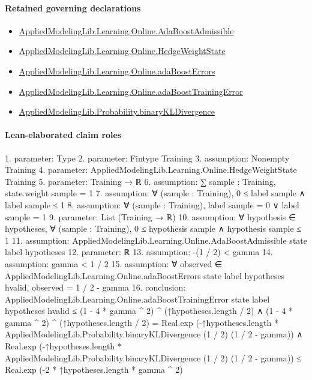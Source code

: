 \documentclass[10pt]{article}
\begin{document}
\paragraph{Retained governing declarations}
\begin{itemize}\raggedright
\item \hyperlink{library-prerequisite-2771987b29f636cf}{Applied\allowbreak{}Modeling\allowbreak{}Lib.\allowbreak{}Learning.\allowbreak{}Online.\allowbreak{}Ada\allowbreak{}Boost\allowbreak{}Admissible}
\item \hyperlink{library-prerequisite-8196082d02788389}{Applied\allowbreak{}Modeling\allowbreak{}Lib.\allowbreak{}Learning.\allowbreak{}Online.\allowbreak{}Hedge\allowbreak{}Weight\allowbreak{}State}
\item \hyperlink{library-prerequisite-ff1cefb5582d918e}{Applied\allowbreak{}Modeling\allowbreak{}Lib.\allowbreak{}Learning.\allowbreak{}Online.\allowbreak{}ada\allowbreak{}Boost\allowbreak{}Errors}
\item \hyperlink{governing-declaration-0e5e303d5e8eab7c}{Applied\allowbreak{}Modeling\allowbreak{}Lib.\allowbreak{}Learning.\allowbreak{}Online.\allowbreak{}ada\allowbreak{}Boost\allowbreak{}Training\allowbreak{}Error}
\item \hyperlink{governing-declaration-b1fa8a0b7a6c91ad}{Applied\allowbreak{}Modeling\allowbreak{}Lib.\allowbreak{}Probability.\allowbreak{}binary\allowbreak{}KL\allowbreak{}Divergence}
\end{itemize}
\paragraph{Lean-elaborated claim roles}\begin{ReviewVerbatim}
1. parameter: Type
2. parameter: Fintype Training
3. assumption: Nonempty Training
4. parameter: AppliedModelingLib.Learning.Online.HedgeWeightState Training
5. parameter: Training → ℝ
6. assumption: ∑ sample : Training, state.weight sample = 1
7. assumption: ∀ (sample : Training), 0 ≤ label sample ∧ label sample ≤ 1
8. assumption: ∀ (sample : Training), label sample = 0 ∨ label sample = 1
9. parameter: List (Training → ℝ)
10. assumption: ∀ hypothesis ∈ hypotheses, ∀ (sample : Training), 0 ≤ hypothesis sample ∧ hypothesis sample ≤ 1
11. assumption: AppliedModelingLib.Learning.Online.AdaBoostAdmissible state label hypotheses
12. parameter: ℝ
13. assumption: -(1 / 2) < gamma
14. assumption: gamma < 1 / 2
15. assumption: ∀ observed ∈ AppliedModelingLib.Learning.Online.adaBoostErrors state label hypotheses hvalid, observed = 1 / 2 - gamma
16. conclusion: AppliedModelingLib.Learning.Online.adaBoostTrainingError state label hypotheses hvalid ≤
    (1 - 4 * gamma ^ 2) ^ (↑hypotheses.length / 2) ∧
  (1 - 4 * gamma ^ 2) ^ (↑hypotheses.length / 2) =
      Real.exp (-↑hypotheses.length * AppliedModelingLib.Probability.binaryKLDivergence (1 / 2) (1 / 2 - gamma)) ∧
    Real.exp (-↑hypotheses.length * AppliedModelingLib.Probability.binaryKLDivergence (1 / 2) (1 / 2 - gamma)) ≤
      Real.exp (-2 * ↑hypotheses.length * gamma ^ 2)
\end{ReviewVerbatim}
\end{document}

